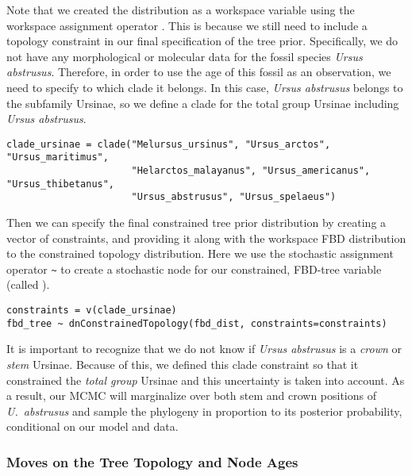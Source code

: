 Note that we created the distribution as a workspace variable using the workspace assignment operator \cl{=}.
This is because we still need to include a topology constraint in our final specification of the tree prior.
Specifically, we do not have any morphological or molecular data for the fossil species \textit{Ursus abstrusus}.
Therefore, in order to use the age of this fossil as an observation, we need to specify to which clade it belongs.
In this case, \textit{Ursus abstrusus} belongs to the subfamily Ursinae, so we define a clade for the total group Ursinae including \textit{Ursus abstrusus}.

{\tt \begin{snugshade*}
\begin{lstlisting}
clade_ursinae = clade("Melursus_ursinus", "Ursus_arctos", "Ursus_maritimus", 
                      "Helarctos_malayanus", "Ursus_americanus", "Ursus_thibetanus", 
                      "Ursus_abstrusus", "Ursus_spelaeus")
\end{lstlisting}
\end{snugshade*}}

Then we can specify the final constrained tree prior distribution by creating a vector of constraints, and providing it along with the workspace FBD distribution to the constrained topology distribution.
Here we use the stochastic assignment operator \verb+~+ to create a stochastic node for our constrained, FBD-tree variable (called ). 

{\tt \begin{snugshade*}
\begin{lstlisting}
constraints = v(clade_ursinae)
fbd_tree ~ dnConstrainedTopology(fbd_dist, constraints=constraints)
\end{lstlisting}
\end{snugshade*}}

It is important to recognize that we do not know if \textit{Ursus abstrusus} is a \textit{crown} or \textit{stem} Ursinae. 
Because of this, we defined this clade constraint so that it constrained the \textit{total group} Ursinae and this uncertainty is taken into account.
As a result, our MCMC will marginalize over both stem and crown positions of \textit{U.\ abstrusus} and sample the phylogeny in proportion to its posterior probability, conditional on our model and data.

\subsubsection{Moves on the Tree Topology and Node Ages}\label{subsub:Exercise-FBD-TreeMoves}

